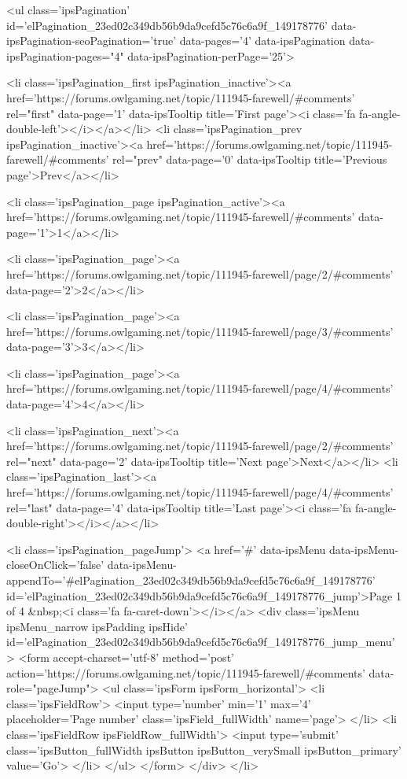 	
	<ul class='ipsPagination' id='elPagination_23ed02c349db56b9da9cefd5c76c6a9f_149178776' data-ipsPagination-seoPagination='true' data-pages='4' data-ipsPagination  data-ipsPagination-pages="4" data-ipsPagination-perPage='25'>
		
			
				<li class='ipsPagination_first ipsPagination_inactive'><a href='https://forums.owlgaming.net/topic/111945-farewell/#comments' rel="first" data-page='1' data-ipsTooltip title='First page'><i class='fa fa-angle-double-left'></i></a></li>
				<li class='ipsPagination_prev ipsPagination_inactive'><a href='https://forums.owlgaming.net/topic/111945-farewell/#comments' rel="prev" data-page='0' data-ipsTooltip title='Previous page'>Prev</a></li>
			
			<li class='ipsPagination_page ipsPagination_active'><a href='https://forums.owlgaming.net/topic/111945-farewell/#comments' data-page='1'>1</a></li>
			
				
					<li class='ipsPagination_page'><a href='https://forums.owlgaming.net/topic/111945-farewell/page/2/#comments' data-page='2'>2</a></li>
				
					<li class='ipsPagination_page'><a href='https://forums.owlgaming.net/topic/111945-farewell/page/3/#comments' data-page='3'>3</a></li>
				
					<li class='ipsPagination_page'><a href='https://forums.owlgaming.net/topic/111945-farewell/page/4/#comments' data-page='4'>4</a></li>
				
				<li class='ipsPagination_next'><a href='https://forums.owlgaming.net/topic/111945-farewell/page/2/#comments' rel="next" data-page='2' data-ipsTooltip title='Next page'>Next</a></li>
				<li class='ipsPagination_last'><a href='https://forums.owlgaming.net/topic/111945-farewell/page/4/#comments' rel="last" data-page='4' data-ipsTooltip title='Last page'><i class='fa fa-angle-double-right'></i></a></li>
			
			
				<li class='ipsPagination_pageJump'>
					<a href='#' data-ipsMenu data-ipsMenu-closeOnClick='false' data-ipsMenu-appendTo='#elPagination_23ed02c349db56b9da9cefd5c76c6a9f_149178776' id='elPagination_23ed02c349db56b9da9cefd5c76c6a9f_149178776_jump'>Page 1 of 4 &nbsp;<i class='fa fa-caret-down'></i></a>
					<div class='ipsMenu ipsMenu_narrow ipsPadding ipsHide' id='elPagination_23ed02c349db56b9da9cefd5c76c6a9f_149178776_jump_menu'>
						<form accept-charset='utf-8' method='post' action='https://forums.owlgaming.net/topic/111945-farewell/#comments' data-role="pageJump">
							<ul class='ipsForm ipsForm_horizontal'>
								<li class='ipsFieldRow'>
									<input type='number' min='1' max='4' placeholder='Page number' class='ipsField_fullWidth' name='page'>
								</li>
								<li class='ipsFieldRow ipsFieldRow_fullWidth'>
									<input type='submit' class='ipsButton_fullWidth ipsButton ipsButton_verySmall ipsButton_primary' value='Go'>
								</li>
							</ul>
						</form>
					</div>
				</li>
			
